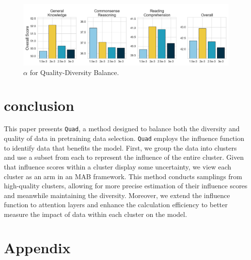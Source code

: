 \documentclass{article} %
\begin{document}
\begin{figure}[h]
\begin{center}
\includegraphics[width=1\textwidth]{exp-fig5.png}
\end{center}
\caption{$\alpha$ for Quality-Diversity Balance.}
\label{exploration}
\end{figure}


\section{conclusion}
This paper presents \texttt{Quad}, a method designed to balance both the diversity and quality of data in pretraining data selection. \texttt{Quad} employs the influence function to identify data that benefits the model. First, we group the data into clusters and use a subset from each to represent the influence of the entire cluster. Given that influence scores within a cluster display some uncertainty, we view each cluster as an arm in an MAB framework. This method conducts samplings from high-quality clusters, allowing for more precise estimation of their influence scores and meanwhile maintaining the diversity. Moreover, we extend the influence function to attention layers and enhance the calculation efficiency to better measure the impact of data within each cluster on the model.




\newpage
\appendix
\section{Appendix}
\end{document}
